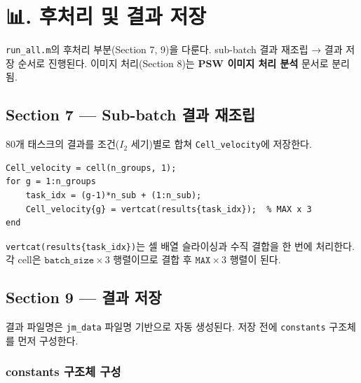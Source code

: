 \documentclass[11pt, a4paper]{article}
\newcommand{\emo}[1]{{\emojifont #1}}
\begin{document}
\section{\emo{📊}. 후처리 및 결과 저장}

\begin{callout}[📌]
\texttt{run\_all.m}의 후처리 부분(Section 7, 9)을 다룬다.
sub-batch 결과 재조립 → 결과 저장 순서로 진행된다.
이미지 처리(Section 8)는 \textbf{PSW 이미지 처리 분석} 문서로 분리됨.
\end{callout}

\subsection{Section 7 — Sub-batch 결과 재조립}

80개 태스크의 결과를 조건($I_2$ 세기)별로 합쳐 \texttt{Cell\_velocity}에 저장한다.

\begin{lstlisting}
Cell_velocity = cell(n_groups, 1);
for g = 1:n_groups
    task_idx = (g-1)*n_sub + (1:n_sub);
    Cell_velocity{g} = vertcat(results{task_idx});  % MAX x 3
end
\end{lstlisting}

\begin{tip}[💡]
\texttt{vertcat(results\{task\_idx\})}는 셀 배열 슬라이싱과 수직 결합을 한 번에 처리한다.
각 cell은 $\texttt{batch\_size}\times 3$ 행렬이므로 결합 후 $\texttt{MAX}\times 3$ 행렬이 된다.
\end{tip}

\subsection{Section 9 — 결과 저장}

결과 파일명은 \texttt{jm\_data} 파일명 기반으로 자동 생성된다.
저장 전에 \texttt{constants} 구조체를 먼저 구성한다.

\subsubsection{constants 구조체 구성}
\end{document}
